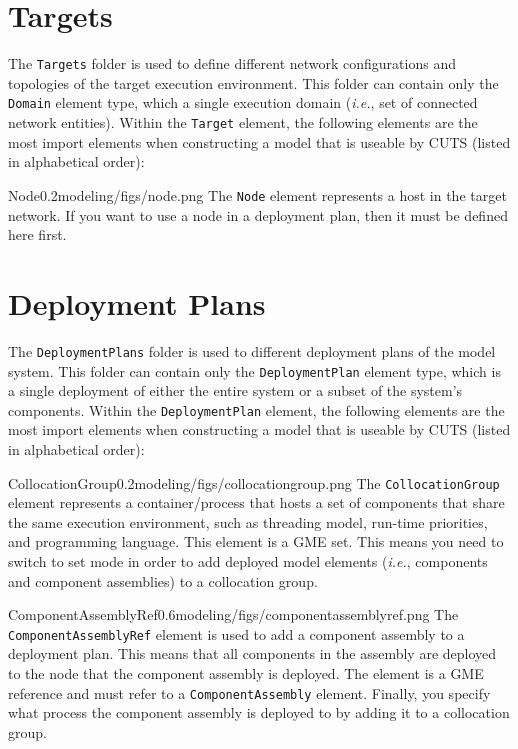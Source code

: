 \section{Targets}

The \texttt{Targets} folder is used to define different network
configurations and topologies of the target execution environment. 
This folder can contain only the \texttt{Domain} element
type, which a single execution domain (\textit{i.e.}, set of 
connected network entities). Within the \texttt{Target} element, the 
following elements are the most import elements when constructing 
a model that is useable by CUTS (listed in alphabetical order):

\begin{modelelement}{Node}{0.2}{modeling/figs/node.png}
The \texttt{Node} element represents a host in the target network. 
If you want to use a node in a deployment plan, then it must be 
defined here first.
\end{modelelement}

\section{Deployment Plans}

The \texttt{DeploymentPlans} folder is used to different
deployment plans of the model system. This folder can contain 
only the \texttt{DeploymentPlan} element
type, which is a single deployment of either the entire system or
a subset of the system's components. Within the \texttt{DeploymentPlan} 
element, the  following elements are the most import elements when 
constructing a model that is useable by CUTS (listed in alphabetical order):

\begin{modelelement}{CollocationGroup}{0.2}{modeling/figs/collocationgroup.png}
The \texttt{CollocationGroup} element represents a container/\-process 
that hosts a set of components that share the same execution environment,
such as threading model, run-time priorities, and programming language.
This element is a GME set. This means you need to switch to set mode
in order to add deployed model elements (\textit{i.e.}, components
and component assemblies) to a collocation group.
\end{modelelement}

\begin{modelelement}{ComponentAssemblyRef}{0.6}{modeling/figs/componentassemblyref.png}
The \texttt{ComponentAssemblyRef} element is used to add a component
assembly to a deployment plan. This means that all components in the 
assembly are deployed to the node that the component assembly is deployed. 
The element is a GME reference and must refer to a \texttt{ComponentAssembly} 
element.  Finally, you specify what process the component assembly
is deployed to by adding it to a collocation group.
\end{modelelement}

